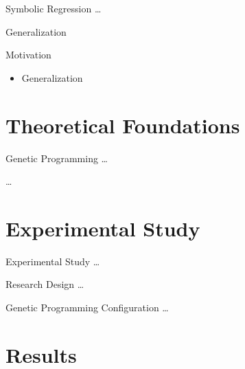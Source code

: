 \documentclass[
  ignorenonframetext,
]{beamer}
\providecommand{\tightlist}{%
  \setlength{\itemsep}{0pt}\setlength{\parskip}{0pt}}
\begin{document}
\begin{frame}{Symbolic Regression}
\protect\hypertarget{symbolic-regression}{}
\ldots{}
\end{frame}

\begin{frame}{Generalization}
\protect\hypertarget{generalization}{}
\end{frame}

\begin{frame}{Motivation}
\protect\hypertarget{motivation}{}
\begin{itemize}
\tightlist
\item
  Generalization
\end{itemize}
\end{frame}

\hypertarget{theoretical-foundations}{%
\section{Theoretical Foundations}\label{theoretical-foundations}}

\begin{frame}{Genetic Programming}
\protect\hypertarget{genetic-programming-1}{}
\ldots{}

\ldots{}
\end{frame}

\hypertarget{experimental-study}{%
\section{Experimental Study}\label{experimental-study}}

\begin{frame}{Experimental Study}
\ldots{}
\end{frame}

\begin{frame}{Research Design}
\protect\hypertarget{research-design}{}
\ldots{}
\end{frame}

\begin{frame}{Genetic Programming Configuration}
\protect\hypertarget{genetic-programming-configuration}{}
\ldots{}
\end{frame}

\hypertarget{results}{%
\section{Results}\label{results}}
\end{document}
